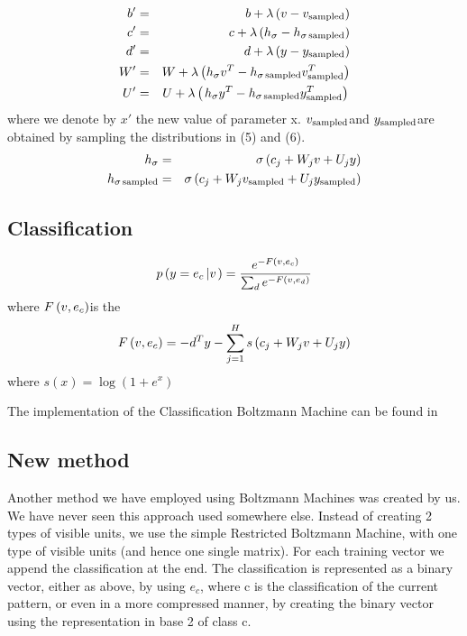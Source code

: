 \begin{eqnarray*}
  b'  & = & b + \lambda \left( v - v_{\operatorname{sampled}} \right)\\
  c'  & = & c + \lambda \left( h_{\sigma} - h_{\sigma \operatorname{sampled}}
  \right)\\
  d'  & = & d + \lambda \left( y - y_{\operatorname{sampled}} \right)\\
  W'  & = & W + \lambda \left( h_{\sigma} v^T - h_{\sigma \operatorname{sampled}}
  v_{\operatorname{sampled}}^T \right)\\
  U' & = & U + \lambda \left( \left. h_{\sigma} y^T - h_{\sigma
  \operatorname{sampled}} y_{\operatorname{sampled}}^T \right) \right.
\end{eqnarray*}
where we denote by $x'$ the new value of parameter x. $v_{\operatorname{sampled}} $and
$y_{\operatorname{sampled}} $are obtained by sampling the distributions in (5) and
(6).
\begin{eqnarray*}
  h_{\sigma} & = & \sigma \left( c_j +   W_j v  + U_j y
  \right)\\
  h_{\sigma \operatorname{sampled}} & = & \sigma \left( c_j +   W_j
  v_{\operatorname{sampled}}  + U_j y_{\operatorname{sampled}}  \right)
\end{eqnarray*}
\subsection{Classification}
\[ p \left( y = e_c \left| v \right. \right) = \frac{e^{- F \left( v ,
   e_c \right)}}{\sum_d e^{- F \left( v , e_d \right)}} \]
where $F \left( v , e_c \right) $is the 
\[ F \left( v , e_c \right) = - d^T y - \sum^H_{j = 1}
   {{s}} \left( c_j +   W_j v  + U_j y
   \right)  \]
where $s \left( x \right) = \log \left( 1 + e^x \right) $



The implementation of the Classification Boltzmann Machine can be found in




\subsection{New method}

Another method we have employed using Boltzmann Machines was created by us. We
have never seen this approach used somewhere else. Instead of creating 2 types
of visible units, we use the simple Restricted Boltzmann Machine, with one
type of visible units (and hence one single matrix). For each training vector
we append the classification at the end. The classification is represented as
a binary vector, either as above, by using $e_c$, where c is the
classification of the current pattern, or even in a more compressed manner, by
creating the binary vector using the representation in base 2 of class c.

